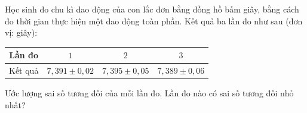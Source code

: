 \begin{ex}
Học sinh đo chu kì dao động của con lắc đơn bằng đồng hồ bấm giây, bằng cách đo thời gian thực hiện một dao động toàn phần. Kết quả ba lần đo như sau (đơn vị: giây):
\begin{center}
\begin{tabular}{|c|c|c|c|}\hline
Lần đo & $1$ & $2$ & $3$\\\hline
Kết quả & $7{,}391\pm0{,}02$ & $7{,}395\pm0{,}05$ & $7{,}389\pm0{,}06$\\\hline
\end{tabular}
\end{center}
Ước lượng sai số tương đối của mỗi lần đo. Lần đo nào có sai số tương đối nhỏ nhất?
\end{ex}
